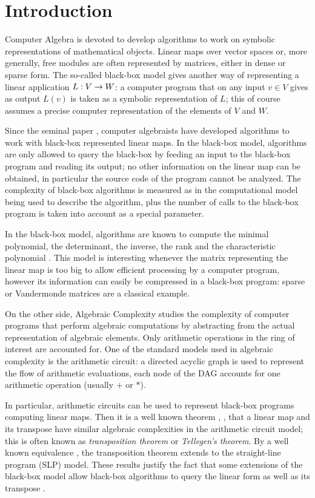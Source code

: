 \section{Introduction}
\label{sec:introduction}

Computer Algebra is devoted to develop algorithms to work on symbolic
representations of mathematical objects. Linear maps over vector
spaces or, more generally, free modules are often represented by
matrices, either in dense or sparse form.  The so-called black-box
model gives another way of representing a linear application $L:V\rightarrow
W$: a computer program that on any input $v\in V$ gives as output
$L(v)$ is taken as a symbolic representation of $L$; this of course
assumes a precise computer representation of the elements of $V$ and
$W$.

Since the seminal paper \cite{wiedemann:sparse}, computer algebraists
have developed algorithms to work with black-box represented linear
maps.  In the black-box model, algorithms are only allowed to query
the black-box by feeding an input to the black-box program and reading
its output; no other information on the linear map can be obtained, in
particular the source code of the program cannot be analyzed. The
complexity of black-box algorithms is measured as in the computational
model being used to describe the algorithm, plus the number of calls
to the black-box program is taken into account as a special parameter.

In the black-box model, algorithms are known to compute the minimal
polynomial, the determinant, the inverse, the rank \cite{Wie86,KaSa91}
and the characteristic polynomial \cite{Ebe00,Vil00,DPS09}.  This
model is interesting whenever the matrix representing the linear map
is too big to allow efficient processing by a computer program,
however its information can easily be compressed in a black-box
program: sparse or Vandermonde matrices are a classical example.

On the other side, Algebraic Complexity studies the complexity of
computer programs that perform algebraic computations by abstracting
from the actual representation of algebraic elements. Only arithmetic
operations in the ring of interest are accounted for. One of the
standard models used in algebraic complexity is the arithmetic
circuit: a directed acyclic graph is used to represent the flow of
arithmetic evaluations, each node of the DAG accounts for one
arithmetic operation (usually $+$ or $*$).

In particular, arithmetic circuits can be used to represent black-box
programs computing linear maps. Then it is a well known theorem
\cite{Bor56}, \cite{Fid73}, \cite[Th. 13.20]{BuClSh} that a linear map
and its transpose have similar algebraic complexities in the
arithmetic circuit model; this is often known as \emph{transposition
  theorem} or \emph{Tellegen's theorem}. By a well known equivalence
\cite[Lemma 13.17]{BuClSh}, the transposition theorem extends to the
straight-line program (SLP) model. These results justify the fact that
some extensions of the black-box model allow black-box algorithms to
query the linear form as well as its transpose \cite{}.

